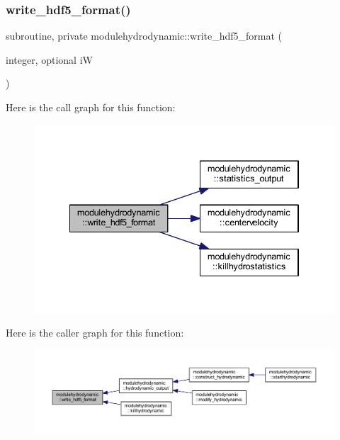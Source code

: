 \subsubsection{\texorpdfstring{write\+\_\+hdf5\+\_\+format()}{write\_hdf5\_format()}}
{\footnotesize\ttfamily subroutine, private modulehydrodynamic\+::write\+\_\+hdf5\+\_\+format (\begin{DoxyParamCaption}\item[{integer, optional}]{iW }\end{DoxyParamCaption})\hspace{0.3cm}{\ttfamily [private]}}

Here is the call graph for this function\+:\nopagebreak
\begin{figure}[H]
\begin{center}
\leavevmode
\includegraphics[width=334pt]{namespacemodulehydrodynamic_affc6eb8b5c260e1da6146c7a34c7849b_cgraph}
\end{center}
\end{figure}
Here is the caller graph for this function\+:\nopagebreak
\begin{figure}[H]
\begin{center}
\leavevmode
\includegraphics[width=350pt]{namespacemodulehydrodynamic_affc6eb8b5c260e1da6146c7a34c7849b_icgraph}
\end{center}
\end{figure}
\mbox{\label{namespacemodulehydrodynamic_ae031a7cef6170ae4c1b13ffb602108a6}} 

